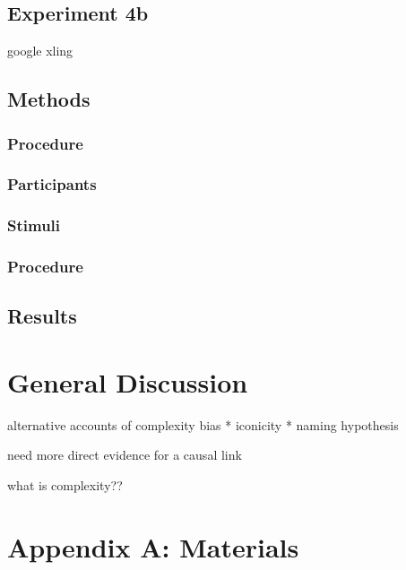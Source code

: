 \documentclass[man]{apa2}
\begin{document}
\subsection{\textbf{Experiment 4b}}
google xling
\subsection{Methods}
\subsubsection{Procedure}
\subsubsection{Participants}
\subsubsection{Stimuli}
\subsubsection{Procedure}
\subsection{Results}

\section{General Discussion}
alternative accounts of complexity bias
* iconicity
* naming hypothesis

need more direct evidence for a causal link

what is complexity??




\newpage
\theappendix 

\section{Appendix A: Materials}
\end{document}
